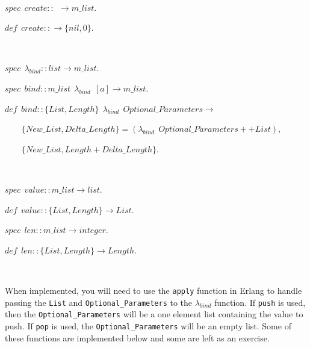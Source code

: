 \documentclass[
]{book}
\begin{document}
\(\nonumber\)

\begin{formulabox}
\(spec ~ ~ create :: ~ ~ \rightarrow m\_list.\)

\(de\mathit{f} ~ ~ create :: \rightarrow \lbrace nil, 0 \rbrace.\)

\end{formulabox}

\(\nonumber\)

\begin{formulabox}
\(spec ~ ~ \lambda_{bind} :: list \rightarrow m\_list.\)

\(spec ~ ~ bind :: m\_list ~ ~ \lambda_{bind} ~ ~ [a] \rightarrow m\_list.\)

\(de\mathit{f} ~ ~ bind :: \lbrace List, Length \rbrace ~ ~ \lambda_{bind} ~ ~ Optional\_Parameters \rightarrow\)

\(\quad \quad \lbrace New\_List, Delta\_Length \rbrace = (\lambda_{bind} ~ ~ Optional\_Parameters ++ List),\)

\(\quad \quad \lbrace New\_List, Length + Delta\_Length \rbrace.\)

\end{formulabox}

\(\nonumber\)

\begin{formulabox}
\(spec ~ ~ value :: m\_list \rightarrow list.\)

\(de\mathit{f} ~ ~ value :: \lbrace List, Length \rbrace \rightarrow List.\)

\(spec ~ ~ len :: m\_list \rightarrow integer.\)

\(de\mathit{f} ~ ~ len :: \lbrace List, Length \rbrace \rightarrow Length.\)

\end{formulabox}

\(\nonumber\)

When implemented, you will need to use the \texttt{apply} function in Erlang to handle passing the \texttt{List} and \texttt{Optional\_Parameters} to the \(\lambda_{bind}\) function. If \texttt{push} is used, then the \texttt{Optional\_Parameters} will be a one element list containing the value to push. If \texttt{pop} is used, the \texttt{Optional\_Parameters} will be an empty list. Some of these functions are implemented below and some are left as an exercise.
\end{document}
